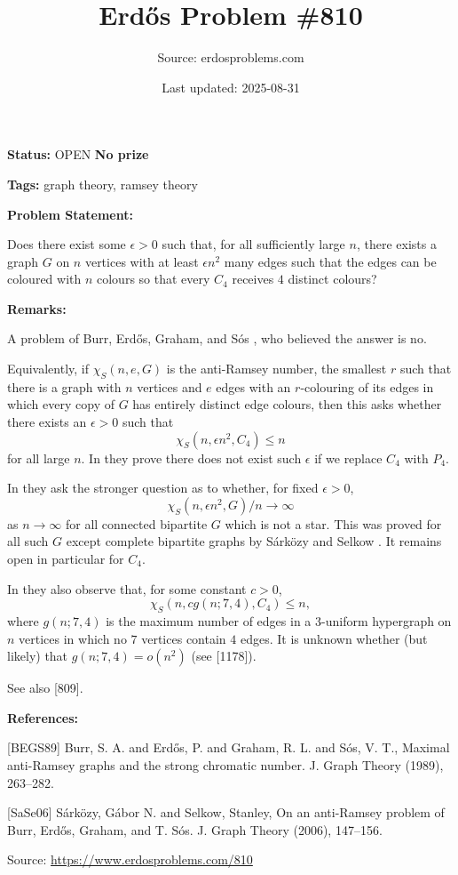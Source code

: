 \documentclass{article}
\title{Erd\H{o}s Problem \#810}
\date{Last updated: 2025-08-31}
\author{Source: erdosproblems.com}
\begin{document}
\maketitle

\noindent\textbf{Status:} OPEN \quad \textbf{No prize}

\noindent\textbf{Tags:} graph theory, ramsey theory

\medskip
\noindent\textbf{Problem Statement:}

Does there exist some $\epsilon>0$ such that, for all sufficiently large $n$, there exists a graph $G$ on $n$ vertices with at least $\epsilon n^2$ many edges such that the edges can be coloured with $n$ colours so that every $C_4$ receives $4$ distinct colours?

\bigskip
\noindent\textbf{Remarks:}

A problem of Burr, Erd\H{o}s, Graham, and S\'{o}s \cite{BEGS89}, who believed the answer is no.

Equivalently, if $\chi_S(n,e,G)$ is the anti-Ramsey number, the smallest $r$ such that there is a graph with $n$ vertices and $e$ edges with an $r$-colouring of its edges in which every copy of $G$ has entirely distinct edge colours, then this asks whether there exists an $\epsilon>0$ such that\[\chi_S(n,\epsilon n^2,C_4)\leq n\]for all large $n$. In \cite{BEGS89} they prove there does not exist such $\epsilon$ if we replace $C_4$ with $P_4$.

In \cite{BEGS89} they ask the stronger question as to whether, for fixed $\epsilon>0$,\[\chi_S(n,\epsilon n^2,G)/n\to \infty\]as $n\to \infty$ for all connected bipartite $G$ which is not a star. This was proved for all such $G$ except complete bipartite graphs by S\'{a}rk\"{o}zy and Selkow \cite{SaSe06}. It remains open in particular for $C_4$.

In \cite{BEGS89} they also observe that, for some constant $c>0$,\[\chi_S(n, cg(n;7,4),C_4)\leq n,\]where $g(n;7,4)$ is the maximum number of edges in a $3$-uniform hypergraph on $n$ vertices in which no $7$ vertices contain $4$ edges. It is unknown whether (but likely) that $g(n;7,4)=o(n^2)$ (see [1178]).

See also [809].

\bigskip
\noindent\textbf{References:}

[BEGS89] Burr, S. A. and Erd\H{o}s, P. and Graham, R. L. and S\'os, V.
T., Maximal anti-{R}amsey graphs and the strong chromatic number. J. Graph Theory (1989), 263--282.
 
 [SaSe06] S\'{a}rk\"ozy, G\'{a}bor N. and Selkow, Stanley, On an anti-{R}amsey problem of {B}urr, {E}rd\H os, {G}raham,
and T. S\'os. J. Graph Theory (2006), 147--156.

\bigskip
\noindent\small{Source: \url{https://www.erdosproblems.com/810}}
\end{document}
